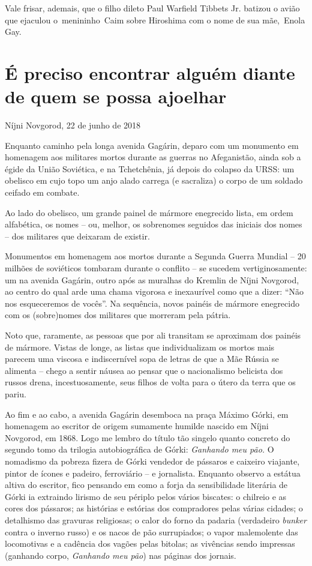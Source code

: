 Vale frisar, ademais, que o filho dileto Paul Warfield Tibbets Jr.
batizou o avião que ejaculou o~menininho~Caim sobre Hiroshima com o nome
de sua mãe,~Enola Gay.

\chapter*{É preciso encontrar alguém diante de quem se possa ajoelhar}

\begin{flushright}
Níjni Novgorod, 22 de junho de 2018
\end{flushright}

Enquanto caminho pela longa avenida Gagárin, deparo com um monumento em
homenagem aos militares mortos durante as guerras no Afeganistão, ainda
sob a égide da União Soviética, e na Tchetchênia, já depois do colapso
da URSS: um obelisco em cujo topo um anjo alado carrega (e sacraliza) o
corpo de um soldado ceifado em combate.

Ao lado do obelisco, um grande painel de mármore enegrecido lista, em
ordem alfabética, os nomes -- ou, melhor, os sobrenomes seguidos das
iniciais dos nomes -- dos militares que deixaram de existir.

Monumentos em homenagem aos mortos durante a Segunda Guerra Mundial --
20 milhões de soviéticos tombaram durante o conflito -- se sucedem
vertiginosamente: um na avenida Gagárin, outro após as muralhas do
Kremlin de Níjni Novgorod, ao centro do qual arde uma chama vigorosa e
inexaurível como que a dizer: ``Não nos esqueceremos de vocês''. Na
sequência, novos painéis de mármore enegrecido com os (sobre)nomes dos
militares que morreram pela pátria.

Noto que, raramente, as pessoas que por ali transitam se aproximam dos
painéis de mármore. Vistas de longe, as listas que individualizam os
mortos mais parecem uma viscosa e indiscernível sopa de letras de que a
Mãe Rússia se alimenta -- chego a sentir náusea ao pensar que o
nacionalismo belicista dos russos drena, incestuosamente, seus filhos de
volta para o útero da terra que os pariu.

Ao fim e ao cabo, a avenida Gagárin desemboca na praça Máximo Górki, em
homenagem ao escritor de origem sumamente humilde nascido em Níjni
Novgorod, em 1868. Logo me lembro do título tão singelo quanto concreto
do segundo tomo da trilogia autobiográfica de Górki: \emph{Ganhando meu
pão.} O nomadismo da pobreza fizera de Górki vendedor de pássaros e
caixeiro viajante, pintor de ícones e padeiro, ferroviário -- e
jornalista. Enquanto observo a estátua altiva do escritor, fico pensando
em como a forja da sensibilidade literária de Górki ia extraindo lirismo
de seu périplo pelos vários biscates: o chilreio e as cores dos
pássaros; as histórias e estórias dos compradores pelas várias cidades;
o detalhismo das gravuras religiosas; o calor do forno da padaria
(verdadeiro \emph{bunker} contra o inverno russo) e os nacos de pão
surrupiados; o vapor malemolente das locomotivas e a cadência dos vagões
pelas bitolas; as vivências sendo impressas (ganhando corpo,
\emph{Ganhando meu pão}) nas páginas dos jornais.

